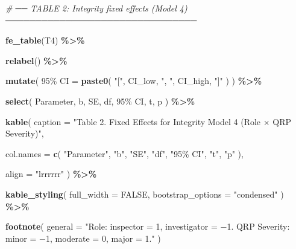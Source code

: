 \documentclass[
]{article}
\newenvironment{Shaded}{\begin{snugshade}}{\end{snugshade}}
\newcommand{\AttributeTok}[1]{\textcolor[rgb]{0.13,0.29,0.53}{#1}}
\newcommand{\CommentTok}[1]{\textcolor[rgb]{0.56,0.35,0.01}{\textit{#1}}}
\newcommand{\ConstantTok}[1]{\textcolor[rgb]{0.56,0.35,0.01}{#1}}
\newcommand{\FunctionTok}[1]{\textcolor[rgb]{0.13,0.29,0.53}{\textbf{#1}}}
\newcommand{\NormalTok}[1]{#1}
\newcommand{\OtherTok}[1]{\textcolor[rgb]{0.56,0.35,0.01}{#1}}
\newcommand{\SpecialCharTok}[1]{\textcolor[rgb]{0.81,0.36,0.00}{\textbf{#1}}}
\newcommand{\StringTok}[1]{\textcolor[rgb]{0.31,0.60,0.02}{#1}}
\begin{document}
\begin{Shaded}
\begin{Highlighting}[]
\CommentTok{\# ── TABLE 2: Integrity fixed effects (Model 4) ────────────────────────────────}

\FunctionTok{fe\_table}\NormalTok{(T4) }\SpecialCharTok{\%\textgreater{}\%}

  \FunctionTok{relabel}\NormalTok{() }\SpecialCharTok{\%\textgreater{}\%}

  \FunctionTok{mutate}\NormalTok{(}
    \StringTok{\textasciigrave{}}\AttributeTok{95\% CI}\StringTok{\textasciigrave{}} \OtherTok{=}
      \FunctionTok{paste0}\NormalTok{(}
        \StringTok{"["}\NormalTok{,}
\NormalTok{        CI\_low,}
        \StringTok{", "}\NormalTok{,}
\NormalTok{        CI\_high,}
        \StringTok{"]"}
\NormalTok{      )}
\NormalTok{  ) }\SpecialCharTok{\%\textgreater{}\%}

  \FunctionTok{select}\NormalTok{(}
\NormalTok{    Parameter,}
\NormalTok{    b,}
\NormalTok{    SE,}
\NormalTok{    df,}
    \StringTok{\textasciigrave{}}\AttributeTok{95\% CI}\StringTok{\textasciigrave{}}\NormalTok{,}
\NormalTok{    t,}
\NormalTok{    p}
\NormalTok{  ) }\SpecialCharTok{\%\textgreater{}\%}

  \FunctionTok{kable}\NormalTok{(}
    \AttributeTok{caption =}
      \StringTok{"Table 2. Fixed Effects for Integrity Model 4 (Role × QRP Severity)"}\NormalTok{,}

    \AttributeTok{col.names =} \FunctionTok{c}\NormalTok{(}
      \StringTok{"Parameter"}\NormalTok{,}
      \StringTok{"b"}\NormalTok{,}
      \StringTok{"SE"}\NormalTok{,}
      \StringTok{"df"}\NormalTok{,}
      \StringTok{"95\% CI"}\NormalTok{,}
      \StringTok{"t"}\NormalTok{,}
      \StringTok{"p"}
\NormalTok{    ),}

    \AttributeTok{align =} \StringTok{"lrrrrrr"}
\NormalTok{  ) }\SpecialCharTok{\%\textgreater{}\%}

  \FunctionTok{kable\_styling}\NormalTok{(}
    \AttributeTok{full\_width =} \ConstantTok{FALSE}\NormalTok{,}
    \AttributeTok{bootstrap\_options =} \StringTok{"condensed"}
\NormalTok{  ) }\SpecialCharTok{\%\textgreater{}\%}

  \FunctionTok{footnote}\NormalTok{(}
    \AttributeTok{general =}
      \StringTok{"Role: inspector = 1, investigator = −1. QRP Severity: minor = −1, moderate = 0, major = 1."}
\NormalTok{  )}
\end{Highlighting}
\end{Shaded}
\end{document}
